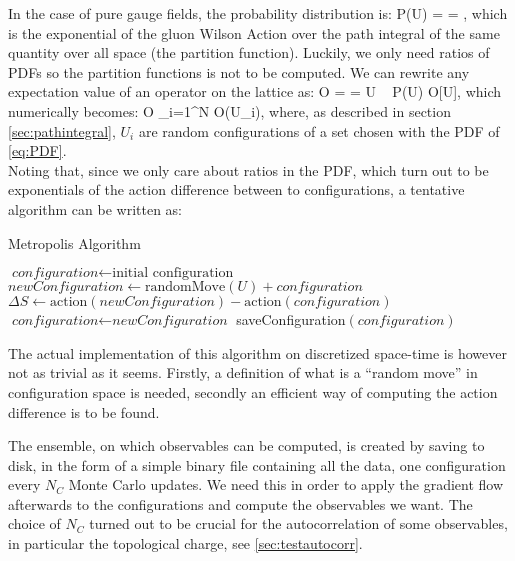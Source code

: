 In the case of pure gauge fields, the probability distribution is:
\beq
\label{eq:PDF}
    P(U) =  = ,
\eeq
which is the exponential of the gluon Wilson Action over the path integral of the same quantity over all space (the partition function). Luckily, we only need ratios of PDFs so the partition functions is not to be computed. We can rewrite any expectation value of an operator on the lattice as:
\beq
    \langle O \rangle =  = \int  \D U ~ P(U) O[U],
\eeq
which numerically becomes:
\beq
\langle O \rangle \approx {} \sum_{i=1}^N O(U_i),
\eeq
where, as described in section \cref{sec:pathintegral}, $U_i$ are random configurations of a set chosen with the PDF of \cref{eq:PDF}. \\
Noting that, since we only care about ratios in the PDF, which turn out to be exponentials of the action difference between to configurations,  a tentative algorithm can be written as: 
\begin{algorithm} [hbt!]
    \caption{Metropolis Algorithm}\label{metropolis:algo}
    \begin{algorithmic}
    \State $\textit{configuration} \gets \text{initial configuration}$
                \State $\textit{newConfiguration}  \gets \text{randomMove}(U) + \textit{configuration}$  
                \State $\Delta S \gets \text{action} (\textit{newConfiguration}) - \text{action} (\textit{configuration})$
                    \State $\textit{configuration} \gets \textit{newConfiguration}$
                \EndIf
            \EndFor 
        \EndFor 
        \State saveConfiguration$(configuration)$
    \EndFor
    \end{algorithmic}  
\end{algorithm} 

The actual implementation of this algorithm on discretized space-time is however not as trivial as it seems. Firstly, a definition of what is a ``random move'' in configuration space is needed, secondly an efficient way of computing the action difference is to be found.

The ensemble, on which observables can be computed, is created by saving to disk, in the form of a simple binary file containing all the data,  one configuration every $N_C$ Monte Carlo updates. We need this in order to apply the gradient flow afterwards to the configurations and compute the observables we want. The choice of $N_C$ turned out to be crucial for the autocorrelation of some observables, in particular the topological charge, see \cref{sec:testautocorr}.


